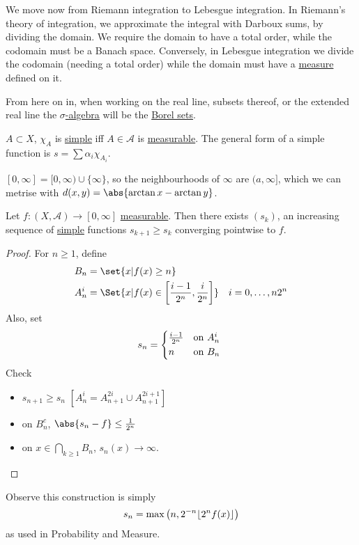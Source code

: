 \documentclass[twoside]{article}
\DeclarePairedDelimiter{\floor}{\lfloor}{\rfloor}
\begin{document}
We move now from Riemann integration to Lebesgue integration.
In Riemann's theory of integration, we approximate the integral with Darboux sums, by dividing the domain. We require the domain to have a total order, while the codomain must be a Banach space.
Conversely, in Lebesgue integration we divide the codomain (needing a total order) while the domain must have a \hyperlink{def:measure}{measure} defined on it.
\begin{defi}[Simple]\hypertarget{def:simple}
    $f: (X, \mathscr{A}) \to (\R, \mathcal{B}(R))$ is \textbf{simple} if it is \hyperlink{def:measure}{measurable} and takes a finite number of values in $[0, \infty)$.
\end{defi}
From here on in, when working on the real line, subsets thereof, or the extended real line the \hyperlink{def:sigAlg}{$\sigma$-algebra} will be the \hyperlink{def:borelSet}{Borel sets}.
\begin{remark}
    $A \subset X$, $\chi_A$ is \hyperlink{def:simple}{simple} iff $A \in \mathscr{A}$ is \hyperlink{def:measFunc}{measurable}.
    The general form of a simple function is $s = \sum \alpha_i \chi_{A_i}$.
\end{remark}
\begin{notation}
    $[0, \infty] = [0, \infty) \cup \{\infty\}$, so the neighbourhoods of $\infty$ are $(a, \infty]$, which we can metrise with $d(x,y) = \abs{\arctan x - \arctan y}$.
\end{notation}
\begin{prop}
    Let $f: (X, \mathscr{A}) \to [0, \infty]$ \hyperlink{def:measFunc}{measurable}.
    Then there exists $(s_k)$, an increasing sequence of \hyperlink{def:simple}{simple} functions $s_{k+1} \geq s_k$ converging pointwise to $f$.
\end{prop}
\begin{proof}
    For $n \geq 1$, define
    \begin{align*}
        B_n &= \set{x | f(x) \geq n}  \\
        A_n^i &= \Set{x | f(x) \in \left[\frac{i-1}{2^n}, \frac{i}{2^n}\right]} \quad i=0, \dotsc, n 2^n
    \end{align*}
    Also, set
    \begin{equation*}
    s_n = \begin{cases*}\frac{i-1}{2^n} & on $A_n^i$ \\ n & on $B_n$\end{cases*}
    \end{equation*}
    Check
    \begin{itemize}
        \item $s_{n+1} \geq s_n$ $[A_n^i = A_{n+1}^{2i} \cup A_{n+1}^{2i+1}]$
        \item on $B_n^c$, $\abs{s_n - f} \leq \frac{1}{2^n}$
        \item on $x \in \bigcap_{k \geq 1} B_n$, $s_n(x) \to \infty$.\qedhere
    \end{itemize}
\end{proof}
Observe this construction is simply
\begin{equation*}
    s_n = \max\left(n, 2^{-n} \floor*{2^{n} f(x)}\right)
\end{equation*}
as used in Probability and Measure.
\end{document}
